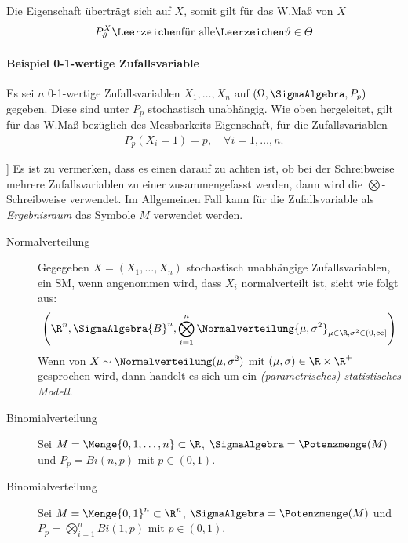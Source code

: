 Die Eigenschaft überträgt sich auf $X$, somit gilt für das \gls{W.}Maß von $X$ 
\begin{align*} 
	P_\vartheta^X\Leerzeichen\text{für alle}\Leerzeichen\vartheta\in\varTheta
\end{align*}
\paragraph{Beispiel 0-1-wertige Zufallsvariable}
Es sei $n$ 0-1-wertige Zufallsvariablen $X_1, \dots, X_n$ auf $(\Omega, \SigmaAlgebra, P_p)$ gegeben. Diese sind unter $P_p$ stochastisch unabhängig. Wie oben hergeleitet, gilt für das \gls{W.}Maß bezüglich des Messbarkeits-Eigenschaft, für die Zufallsvariablen
\begin{align}
	P_p(X_i=1) = p, \quad \forall i = 1, \dots, n.
\end{align}



]
Es ist zu vermerken, dass es einen darauf zu achten ist, ob bei der Schreibweise mehrere Zufallsvariablen zu einer zusammengefasst werden, dann wird die $\bigotimes$-Schreibweise verwendet. Im Allgemeinen Fall kann für die Zufallsvariable als \textit{Ergebnisraum} das Symbole $M$ verwendet werden. 
\begin{description} 
\item[Normalverteilung]	 Gegegeben $X=(X_1,\dots, X_n)$ stochastisch unabhängige Zufallsvariablen, ein \gls{SM}, wenn angenommen wird, dass $X_i$ normalverteilt ist, sieht wie folgt aus:
\begin{align*}
	\left(\R^n ,\SigmaAlgebra{B}^n, \bigotimes_{i=1}^n\Normalverteilung{\mu, \sigma^2}_{\mu\in\R, \sigma^2\in(0,\infty]}\right)
\end{align*} Wenn von $X\sim \Normalverteilung(\mu, \sigma^2)$ mit $(\mu, \sigma)\in\R\times\R^+$ gesprochen wird, dann handelt es sich um ein \textit{(parametrisches) statistisches Modell}.
\item[Binomialverteilung] Sei $M = \Menge{0,1,\dots, n}\subset \R$, $\SigmaAlgebra = \Potenzmenge (M)$ und $P_p = Bi(n,p)$ mit $p\in (0,1)$.
\item[Binomialverteilung] Sei $M = \Menge{0,1}^n\subset \R^n$, $\SigmaAlgebra = \Potenzmenge (M)$ und $P_p = \bigotimes_{i=1}^{n} Bi(1,p)$ mit $p\in (0,1)$.
\end{description}

